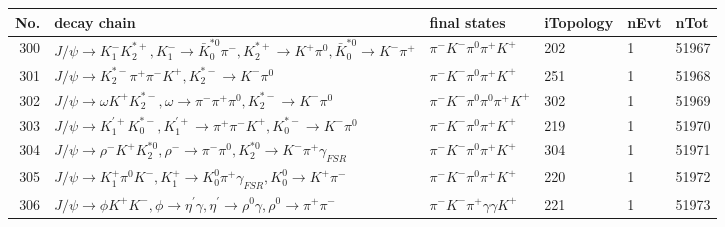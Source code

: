 \begin{table}[htbp] 
\begin{center}
\begin{small}
\begin{tabular}{rlllll}\hline\hline
 No. & decay chain & final states &  iTopology & nEvt & nTot \\\hline
300&$J/\psi       \rightarrow K_{1}^{-}      K_2^{*+}       , K_{1}^{-}       \rightarrow \bar{K}_0^{*0}\pi^{-}        , K_2^{*+}        \rightarrow K^{+}          \pi^{0}        , \bar{K}_0^{*0} \rightarrow K^{-}          \pi^{+}        $&$\pi^{-}        K^{-}          \pi^{0}        \pi^{+}        K^{+}          $&  202&    1&51967\\
301&$J/\psi       \rightarrow K_2^{*-}       \pi^{+}        \pi^{-}        K^{+}          , K_2^{*-}        \rightarrow K^{-}          \pi^{0}        $&$\pi^{-}        K^{-}          \pi^{0}        \pi^{+}        K^{+}          $&  251&    1&51968\\
302&$J/\psi       \rightarrow \omega         K^{+}          K_2^{*-}       , \omega          \rightarrow \pi^{-}        \pi^{+}        \pi^{0}        , K_2^{*-}        \rightarrow K^{-}          \pi^{0}        $&$\pi^{-}        K^{-}          \pi^{0}        \pi^{0}        \pi^{+}        K^{+}          $&  302&    1&51969\\
303&$J/\psi       \rightarrow K_1^{'+}      K_{0}^{*-}     , K_1^{'+}       \rightarrow \pi^{+}        \pi^{-}        K^{+}          , K_{0}^{*-}      \rightarrow K^{-}          \pi^{0}        $&$\pi^{-}        K^{-}          \pi^{0}        \pi^{+}        K^{+}          $&  219&    1&51970\\
304&$J/\psi       \rightarrow \rho^{-}      K^{+}          K_2^{*0}       , \rho^{-}       \rightarrow \pi^{-}        \pi^{0}        , K_2^{*0}        \rightarrow K^{-}          \pi^{+}        \gamma_{FSR} $&$\pi^{-}        K^{-}          \pi^{0}        \pi^{+}        K^{+}          $&  304&    1&51971\\
305&$J/\psi       \rightarrow K_1^{+}        \pi^{0}        K^{-}          , K_1^{+}         \rightarrow K_0^{0}        \pi^{+}        \gamma_{FSR} , K_0^{0}         \rightarrow K^{+}          \pi^{-}        $&$\pi^{-}        K^{-}          \pi^{0}        \pi^{+}        K^{+}          $&  220&    1&51972\\
306&$J/\psi       \rightarrow \phi           K^{+}          K^{-}          , \phi            \rightarrow \eta^{\prime} \gamma       , \eta^{\prime}  \rightarrow \rho^{0}      \gamma       , \rho^{0}       \rightarrow \pi^{+}        \pi^{-}        $&$\pi^{-}        K^{-}          \pi^{+}        \gamma       \gamma       K^{+}          $&  221&    1&51973\\

\end{tabular}
\end{small}
\end{center}
\end{table}
